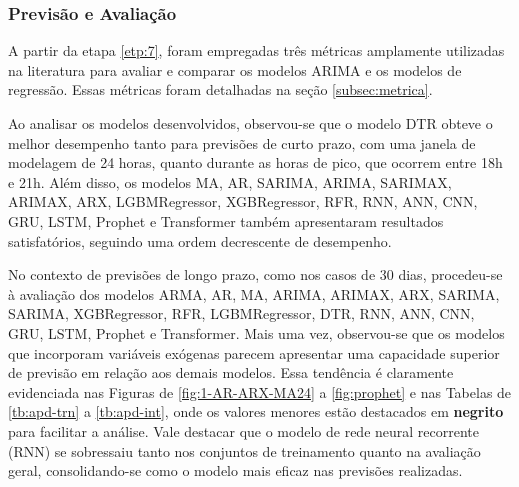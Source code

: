 \subsubsection{Previs\~ao e Avalia\c c\~ao}\label{subsubsec:modelos}

A partir da etapa \ref{etp:7}, foram empregadas três métricas amplamente utilizadas na literatura para avaliar e comparar os modelos ARIMA e os modelos de regressão. Essas métricas foram detalhadas na seção \ref{subsec:metrica}.

Ao analisar os modelos desenvolvidos, observou-se que o modelo DTR obteve o melhor desempenho tanto para previsões de curto prazo, com uma janela de modelagem de 24 horas, quanto durante as horas de pico, que ocorrem entre 18h e 21h. Além disso, os modelos MA, AR, SARIMA, ARIMA, SARIMAX, ARIMAX, ARX, LGBMRegressor, XGBRegressor, RFR, RNN, ANN, CNN, GRU, LSTM, Prophet e Transformer também apresentaram resultados satisfatórios, seguindo uma ordem decrescente de desempenho.

No contexto de previsões de longo prazo, como nos casos de 30 dias, procedeu-se à avaliação dos modelos ARMA, AR, MA, ARIMA, ARIMAX, ARX, SARIMA, SARIMA, XGBRegressor, RFR, LGBMRegressor, DTR, RNN, ANN, CNN, GRU, LSTM, Prophet e Transformer. Mais uma vez, observou-se que os modelos que incorporam variáveis exógenas parecem apresentar uma capacidade superior de previsão em relação aos demais modelos. Essa tendência é claramente evidenciada nas Figuras de \ref{fig:1-AR-ARX-MA24} a \ref{fig:prophet} e nas Tabelas de \ref{tb:apd-trn} a \ref{tb:apd-int}, onde os valores menores estão destacados em \textbf{negrito} para facilitar a análise. Vale destacar que o modelo de rede neural recorrente (RNN) se sobressaiu tanto nos conjuntos de treinamento quanto na avaliação geral, consolidando-se como o modelo mais eficaz nas previsões realizadas.
